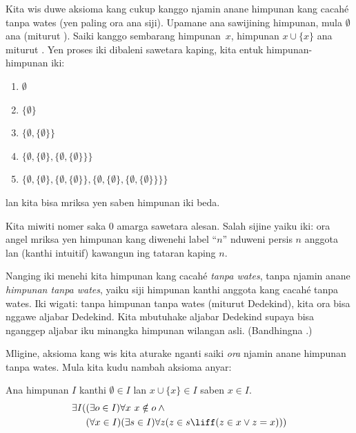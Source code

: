 \documentclass[../../../include/open-logic-section]{subfiles}
\begin{document}

Kita wis duwe aksioma kang cukup kanggo njamin anane
himpunan kang cacahé tanpa wates (yen paling ora ana siji).
Upamane ana sawijining himpunan, mula $\emptyset$ ana
(miturut ). Saiki
kanggo sembarang himpunan~$x$, himpunan $x \cup \{x\}$ ana
miturut .
Yen proses iki dibaleni sawetara kaping, kita entuk
himpunan-himpunan iki:
\begin{enumerate}
	\item[0.] $\emptyset$ %
	\item[1.] $ \{\emptyset\}$ %
	\item[2.] $\{\emptyset, \{\emptyset\}\}$ %
	\item[3.] $\{\emptyset, \{\emptyset\}, \{\emptyset, \{\emptyset\}\}\}$ %
	\item[4.] $\{\emptyset, \{\emptyset\}, \{\emptyset, \{\emptyset\}\}, \{\emptyset, \{\emptyset\}, \{\emptyset, \{\emptyset\}\}\}\}$%
\end{enumerate}
lan kita bisa mriksa yen saben himpunan iki beda.

Kita miwiti nomer saka $0$ amarga sawetara alesan.
Salah sijine yaiku iki: ora angel mriksa yen himpunan
kang diwenehi label ``$n$'' nduweni persis $n$ anggota
lan (kanthi intuitif) kawangun ing tataran kaping $n$.

Nanging iki menehi kita himpunan kang cacahé
\emph{tanpa wates}, tanpa njamin anane \emph{himpunan
tanpa wates}, yaiku siji himpunan kanthi anggota kang
cacahé tanpa wates. Iki wigati: tanpa himpunan tanpa
wates (miturut Dedekind), kita ora bisa nggawe aljabar
Dedekind. Kita mbutuhake aljabar Dedekind supaya bisa
nganggep aljabar iku minangka himpunan wilangan asli.
(Bandhingna .)

Mligine, aksioma kang wis kita aturake nganti saiki
\emph{ora} njamin anane himpunan tanpa wates. Mula
kita kudu nambah aksioma anyar:

\begin{axiom}
Ana himpunan $I$ kanthi $\emptyset \in I$ lan
$x \cup \{x\} \in I$ saben $x \in I$.
\begin{align*}
	\exists I( & (\exists o \in I)\forall x\ x \notin o \land {}\\
	& (\forall x \in I)(\exists s \in I)\forall z(z \in s \liff (z \in x \lor z = x)))
\end{align*}
\end{axiom}
\end{document}
